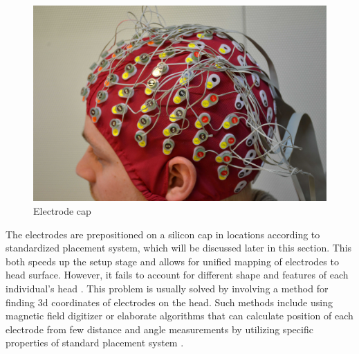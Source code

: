 \begin{figure}[htb]
	\centering
	\includegraphics[width=1\linewidth]{fig/eegCap.jpg}
	\caption[Caption for LOF]{Electrode cap\protect\footnotemark}
	\label{fig:eegCap}
\end{figure}

The electrodes are prepositioned on a silicon cap in locations according to
standardized placement system, which will be discussed later in this section.
This both speeds up the setup stage and allows for unified mapping of electrodes
to head surface. However, it fails to account for different shape and features of each
individual's head \cite{eegFund}. This problem is usually solved by involving a
method for finding \gls{3d} coordinates of electrodes on the head. Such methods
include using magnetic field digitizer or elaborate algorithms that can
calculate position of each electrode from few distance and angle measurements by
utilizing specific properties of standard placement system \cite{rapidPos}.

